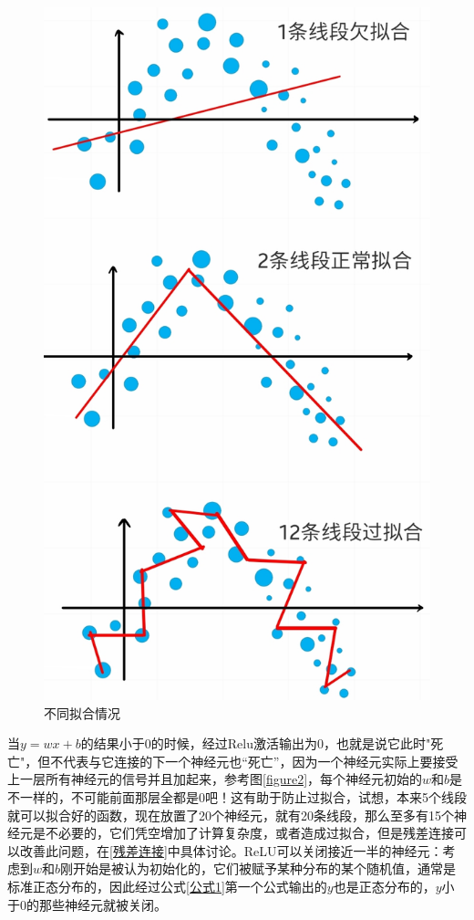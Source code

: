 \documentclass[a5paper, 11pt]{ctexbook}
\begin{document}
\begin{figure}
    \begin{center}
        \includegraphics[scale=0.18]{figures/拟合情况.jpg}
        \caption{不同拟合情况}
        \label{拟合}
    \end{center}
\end{figure}



当$y=wx+b$的结果小于0的时候，经过Relu激活输出为0，也就是说它此时"死亡"，但不代表与它连接的下一个神经元也“死亡”，因为一个神经元实际上要接受上一层所有神经元的信号并且加起来，参考图\ref{figure2}，每个神经元初始的$w$和$b$是不一样的，不可能前面那层全都是0吧！这有助于防止过拟合，试想，本来5个线段就可以拟合好的函数，现在放置了20个神经元，就有20条线段，那么至多有15个神经元是不必要的，它们凭空增加了计算复杂度，或者造成过拟合，但是残差连接可以改善此问题，在\ref{残差连接}中具体讨论。ReLU可以关闭接近一半的神经元：考虑到$w$和$b$刚开始是被认为初始化的，它们被赋予某种分布的某个随机值，通常是标准正态分布的，因此经过公式\ref{公式1}第一个公式输出的$y$也是正态分布的，$y$小于0的那些神经元就被关闭。
\end{document}
